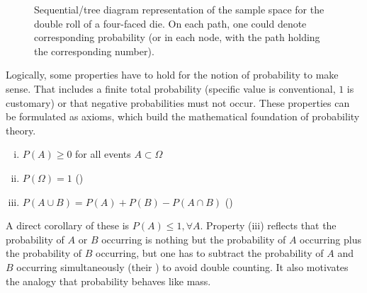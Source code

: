 \begin{figure}
\caption{Sequential/tree diagram representation of the sample space for the double roll of a four-faced die. On each path, one could denote corresponding probability (or in each node, with the path holding the corresponding number).}
\label{fig:sequ_diagram_die}




\iffalse
{
\begin{forest}
  for tree={grow=0,l=3cm,parent anchor=west,anchor=south,child anchor=west, s sep+=10pt}
    [{}, name=t0%
      [for tree={grow=0,l=3cm,parent anchor=west,anchor=west,child anchor=west, s sep+=10pt}
          [{1}]
      ]
      [{$(2, 2)$}, name=t1
        [{$(1,1)$}]
        [{$(4,4)$}, name=t2]
      ]
    ]
\end{forest}
}
\fi
\end{figure}



Logically, some properties have to hold for the notion of probability to make sense. That includes a finite total probability (specific value is conventional, $1$ is customary) or that negative probabilities must not occur. These properties can be formulated as axioms, which build the mathematical foundation of probability theory.
\begin{prop}
\begin{enumerate}[(i)]
\item $P(A) \geq 0$ for all events $A \subset \Omega$

\item $P(\Omega) = 1$ ()

\item $P(A \cup B) = P(A) + P(B) - P(A \cap B)$ ()
\end{enumerate}
\end{prop}
A direct corollary of these is $P(A) \leq 1, \forall A$. Property (iii) reflects that the probability of $A$ or $B$ occurring is nothing but the probability of $A$ occurring plus the probability of $B$ occurring, but one has to subtract the probability of $A$ and $B$ occurring simultaneously (their ) to avoid double counting. It also motivates the analogy that probability behaves like mass.\\


